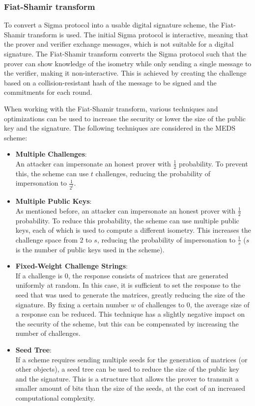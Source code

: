 \documentclass[11pt,a4paper]{report}
\theoremstyle{definition}
\begin{document}
\subsubsection{Fiat-Shamir transform}
\label{sec:fiatshamir}
To convert a Sigma protocol into a usable digital signature scheme, the Fiat-Shamir transform \cite{fiat1986prove} is used. The initial Sigma protocol is interactive, meaning that the prover and verifier exchange messages, which is not suitable for a digital signature. The Fiat-Shamir transform converts the Sigma protocol such that the prover can show knowledge of the isometry while only sending a single message to the verifier, making it non-interactive. This is achieved by creating the challenge based on a collision-resistant hash of the message to be signed and the commitments for each round.

When working with the Fiat-Shamir transform, various techniques and optimizations can be used to increase the security or lower the size of the public key and the signature. The following techniques are considered in the MEDS scheme:
\begin{itemize}
  \item \textbf{Multiple Challenges}:\\
  An attacker can impersonate an honest prover with $\frac{1}{2}$ probability. To prevent this, the scheme can use $t$ challenges, reducing the probability of impersonation to $\frac{1}{2^t}$.
  \item \textbf{Multiple Public Keys}:\\
  As mentioned before, an attacker can impersonate an honest prover with $\frac{1}{2}$ probability. To reduce this probability, the scheme can use multiple public keys, each of which is used to compute a different isometry. This increases the challenge space from $2$ to $s$, reducing the probability of impersonation to $\frac{1}{s}$ ($s$ is the number of public keys used in the scheme).
  \item \textbf{Fixed-Weight Challenge Strings}:\\
  If a challenge is 0, the response consists of matrices that are generated uniformly at random. In this case, it is sufficient to set the response to the seed that was used to generate the matrices, greatly reducing the size of the signature. By fixing a certain number $w$ of challenges to 0, the average size of a response can be reduced. This technique has a slightly negative impact on the security of the scheme, but this can be compensated by increasing the number of challenges.
  \item \textbf{Seed Tree}:\\
  If a scheme requires sending multiple seeds for the generation of matrices (or other objects), a seed tree can be used to reduce the size of the public key and the signature. This is a structure that allows the prover to transmit a smaller amount of bits than the size of the seeds, at the cost of an increased computational complexity.
\end{itemize}
\end{document}
